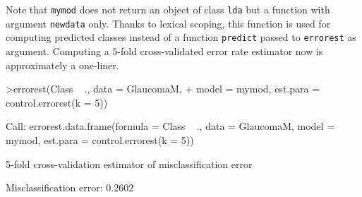 \documentclass[11pt]{article}
\begin{document}
Note that \texttt{mymod} does not return 
an object of class \texttt{lda} but a function
with argument \texttt{newdata} only. Thanks to lexical scoping, this 
function is used for computing
predicted classes instead of a function \texttt{predict} passed to
\texttt{errorest} as argument. Computing a $5$-fold cross-validated error rate
estimator now is approximately a one-liner.

\begin{Schunk}
\begin{Sinput}
>errorest(Class ~ ., data = GlaucomaM, 
+     model = mymod, est.para = control.errorest(k = 5))
\end{Sinput}
\begin{Soutput}
Call:
errorest.data.frame(formula = Class ~ ., data = GlaucomaM, model = mymod, 
    est.para = control.errorest(k = 5))

	 5-fold cross-validation estimator of misclassification error 

Misclassification error:  0.2602 
\end{Soutput}
\end{Schunk}


\end{document}
